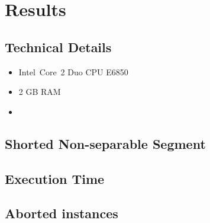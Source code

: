 \chapter{Results}

\section{Technical Details}
\begin{itemize}
  \item Intel\textsuperscript{\textregistered}~Core\texttrademark~2 Duo CPU E6850
  \item 2 GB RAM
  \item {}
\end{itemize}

\section{Shorted Non-separable Segment}

\section{Execution Time}

\section{Aborted instances}
